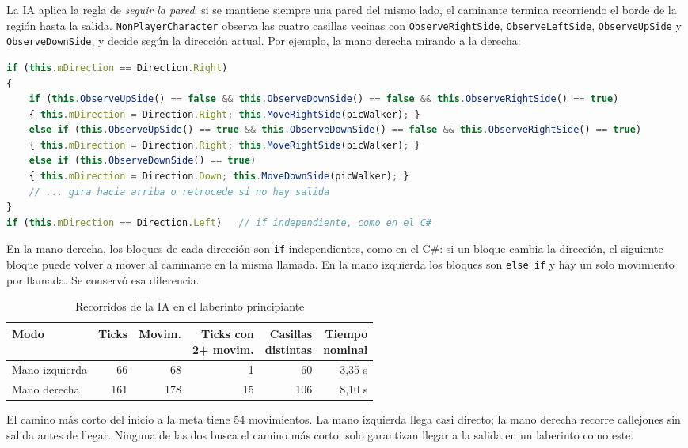 \documentclass[12pt,a4paper]{article}
\begin{document}
La IA aplica la regla de \emph{seguir la pared}: si se mantiene siempre una pared
del mismo lado, el caminante termina recorriendo el borde de la región hasta la
salida. \texttt{NonPlayerCharacter} observa las cuatro casillas vecinas con
\texttt{ObserveRightSide}, \texttt{ObserveLeftSide}, \texttt{ObserveUpSide} y
\texttt{ObserveDownSide}, y decide según la dirección actual. Por ejemplo, la mano
derecha mirando a la derecha:

\begin{lstlisting}[language=JavaScript]
if (this.mDirection == Direction.Right)
{
    if (this.ObserveUpSide() == false && this.ObserveDownSide() == false && this.ObserveRightSide() == true)
    { this.mDirection = Direction.Right; this.MoveRightSide(picWalker); }
    else if (this.ObserveUpSide() == true && this.ObserveDownSide() == false && this.ObserveRightSide() == true)
    { this.mDirection = Direction.Right; this.MoveRightSide(picWalker); }
    else if (this.ObserveDownSide() == true)
    { this.mDirection = Direction.Down; this.MoveDownSide(picWalker); }
    // ... gira hacia arriba o retrocede si no hay salida
}
if (this.mDirection == Direction.Left)   // if independiente, como en el C#
\end{lstlisting}

En la mano derecha, los bloques de cada dirección son \texttt{if} independientes,
como en el C\#: si un bloque cambia la dirección, el siguiente bloque puede volver a
mover al caminante en la misma llamada. En la mano izquierda los bloques son
\texttt{else if} y hay un solo movimiento por llamada. Se conservó esa diferencia.

\begin{table}[H]
\centering\small
\caption{Recorridos de la IA en el laberinto principiante}
\begin{tabular}{lrrrrr}
\toprule
\textbf{Modo} & \textbf{Ticks} & \textbf{Movim.} & \shortstack{\textbf{Ticks con}\\\textbf{2+ movim.}} & \shortstack{\textbf{Casillas}\\\textbf{distintas}} & \shortstack{\textbf{Tiempo}\\\textbf{nominal}}\\
\midrule
Mano izquierda & 66 & 68 & 1 & 60 & 3,35 s\\
Mano derecha & 161 & 178 & 15 & 106 & 8,10 s\\
\bottomrule
\end{tabular}
\end{table}
El camino más corto del inicio a la meta tiene 54 movimientos. La mano izquierda
llega casi directo; la mano derecha recorre callejones sin salida antes de llegar.
Ninguna de las dos busca el camino más corto: solo garantizan llegar a la salida
en un laberinto como este.
\end{document}

